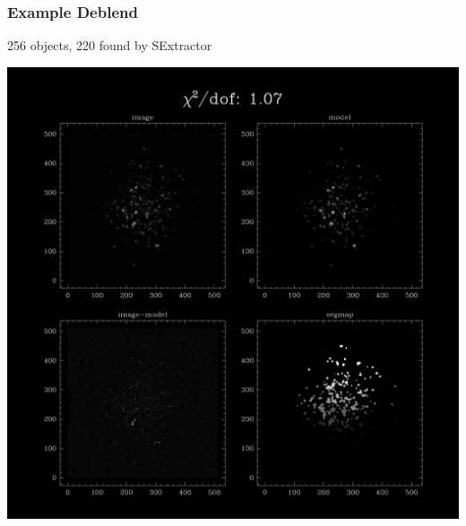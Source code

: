 \documentclass{beamer}
\begin{document}
\frame
{
    \frametitle{Example Deblend}

        256 objects, 220 found by SExtractor
    \begin{center}
        \includegraphics[trim={5cm 3cm 5cm 37cm},clip,width=\columnwidth]{diff-20855-000000.png}
    \end{center}
}
\end{document}
